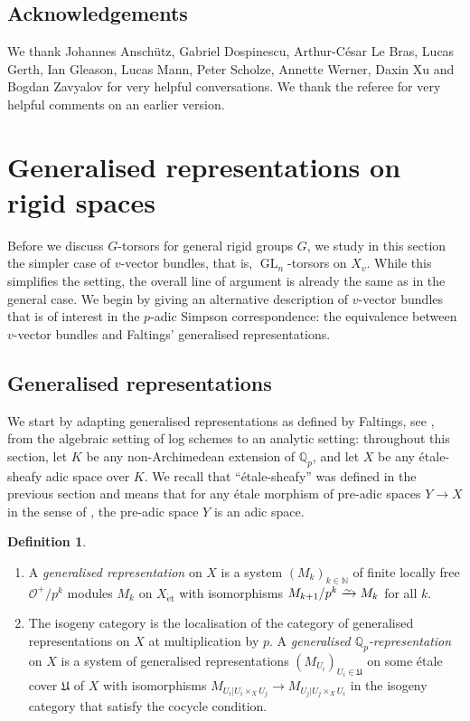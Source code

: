 \documentclass[10pt,a4paper]{article}
\theoremstyle{definition}
\newtheorem{Definition}[thm]{Definition}
\theoremstyle{remark}
\newcommand*{\lowsim}{\vbox to 0pt{\vss\hbox{$\scriptstyle\sim$}\vskip-2pt}}
\newcommand*{\isomarrow}{\xrightarrow{\lowsim}}
\newcommand{\N}{\mathbb{N}}
\renewcommand{\O}{\mathcal{O}}
\newcommand{\Q}{\mathbb{Q}}
\newcommand{\GL}{\operatorname{GL}}
\newcommand{\et}{{\operatorname{\acute{e}t}}}
\numberwithin{equation}{section}
\begin{document}
\subsection*{Acknowledgements}

We thank Johannes Ansch\"utz, Gabriel Dospinescu, Arthur-C\'esar Le Bras, Lucas Gerth, Ian Gleason, Lucas Mann, Peter Scholze, Annette Werner, Daxin Xu and Bogdan Zavyalov for very helpful conversations. We thank the referee for very helpful comments on an earlier version.
  
\section{Generalised representations on rigid spaces}\label{s:generalised-representations}

Before we discuss $G$-torsors for general rigid groups $G$, we study in this section the simpler case of \mbox{$v$-vector} bundles, that is, $\GL_n$-torsors on $X_v$. While this simplifies the setting, the overall line of argument is already the same as in the general case.
We begin by giving an alternative description of $v$-vector bundles that is of interest in the $p$-adic Simpson correspondence: the equivalence between $v$-vector bundles and Faltings' generalised representations.

\subsection{Generalised representations}

We start by adapting generalised representations as defined by Faltings, see \cite[Section~2 and Theo\-rem~3]{Faltings_SimpsonI}, from the algebraic setting of log schemes to an analytic setting: throughout this section, let $K$ be any non-Archimedean extension of $\Q_p$, and let $X$ be any \'etale-sheafy adic space over $K$. We recall that ``\'etale-sheafy'' was defined in the previous section and means that for any \'etale morphism of pre-adic spaces $Y\to X$ in the sense of \cite[Definition 8.2.16]{KedlayaLiu-rel-p-p-adic-Hodge-I}, the pre-adic space $Y$ is an adic space.

\begin{Definition}\leavevmode
	\begin{enumerate}
		\item  A \emph{generalised representation} on $X$ is a system $(M_k)_{k\in \N}$ of finite locally free $\O^+/p^k$ modules $M_k$ on $X_{\et}$ with isomorphisms $M_{k+1}/p^k\isomarrow M_k$ for all $k$. 
		
		\item The isogeny category is the localisation of the category of generalised representations on $X$ at multiplication by $p$.
		A \emph{generalised $\Q_p$-representation} on $X$ is a system of generalised representations $(M_{U_i})_{U_i\in \mathfrak U}$ on some \'etale cover $\mathfrak U$ of $X$ with isomorphisms $M_{U_i|U_i\times_X U_j}\to M_{U_j|U_j\times_X U_i}$ in the isogeny category that satisfy the cocycle condition.
	\end{enumerate}
\end{Definition}
\end{document}
